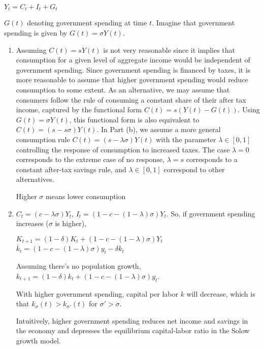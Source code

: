\documentclass{article}
\newcommand{\tmtextbf}[1]{\text{{\bfseries{#1}}}}
\newenvironment{enumeratealpha}{\begin{enumerate}[a{\textup{)}}] }{\end{enumerate}}
\begin{document}
\begin{question}
  \tmtextbf{Government in the Solow Model} $Y_t = C_t + I_t + G_t$
  
  $G (t)$ denoting government spending at time $t$. Imagine that government
  spending is given by $G (t) = \sigma Y (t)$.
  \begin{enumeratealpha}
    \item Assuming $C (t) = s Y (t)$ is not very reasonable since it implies
    that consumption for a given level of aggregate income would be
    independent of government spending. Since government spending is financed
    by taxes, it is more reasonable to assume that higher government spending
    would reduce consumption to some extent. As an alternative, we may assume
    that consumers follow the rule of consuming a constant share of their
    after tax income, captured by the functional form $C (t) = s (Y (t) - G
    (t))$. Using $G (t) = \sigma Y (t)$, this functional form is also
    equivalent to $C (t) = (s - s \sigma) Y (t)$. In Part (b), we assume a
    more general consumption rule $C (t) = (s - \lambda \sigma) Y (t)$ with
    the parameter $\lambda \in [0, 1]$ controlling the response of consumption
    to increased taxes. The case $\lambda = 0$ corresponds to the extreme case
    of no response, $\lambda = s$ corresponds to a constant after-tax savings
    rule, and $\lambda \in [0, 1]$ correspond to other alternatives.
    
    \begin{note*}
      Higher $\sigma$ means lower consumption
    \end{note*}
    
    \item $C_t = (c - \lambda \sigma) Y_t$, $I_t = (1 - c - (1 - \lambda)
    \sigma) Y_t$. So, if government spending increases ($\sigma$ is higher),
    
    $K_{t + 1} = (1 - \delta) K_t + (1 - c - (1 - \lambda) \sigma) Y_t$
    {\Rightarrow} $\dot{k_t} = (1 - c - (1 - \lambda) \sigma) y_t - \delta
    k_t$
    
    Assuming there's no population growth, $k_{t + 1} = (1 - \delta) k_t + (1
    - c - (1 - \lambda) \sigma) y_t$.
    
    With higher government spending, capital per labor $k$ will decrease,
    which is that $k_{\sigma} (t) > k_{\sigma'} (t)$ for $\sigma' > \sigma$.
    
    Intuitively, higher government spending reduces net income and savings in
    the economy and depresses the equilibrium capital-labor ratio in the Solow
    growth model.
    

\end{enumeratealpha}
\end{question}
\end{document}
